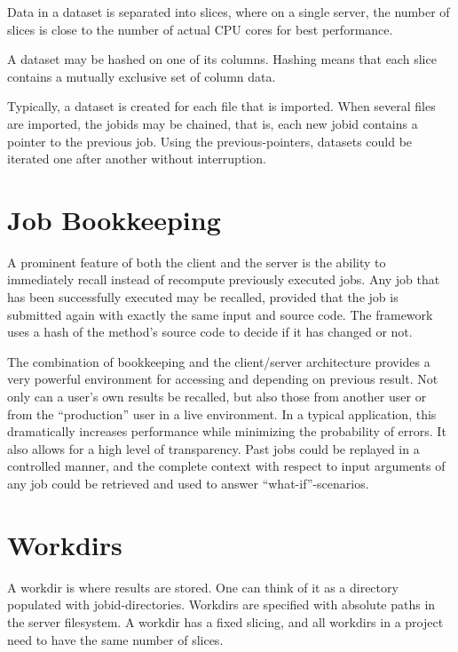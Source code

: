 Data in a dataset is separated into slices, where on a single server,
the number of slices is close to the number of actual CPU cores for
best performance.

A dataset may be hashed on one of its columns.  Hashing means that
each slice contains a mutually exclusive set of column data.

Typically, a dataset is created for each file that is imported.  When
several files are imported, the jobids may be chained, that is, each
new jobid contains a pointer to the previous job.  Using the
previous-pointers, datasets could be iterated one after another
without interruption.



\section{Job Bookkeeping}

A prominent feature of both the client and the server is the ability
to immediately recall instead of recompute previously executed jobs.
Any job that has been successfully executed may be recalled, provided
that the job is submitted again with exactly the same input and source
code.  The framework uses a hash of the method's source code to decide
if it has changed or not.

The combination of bookkeeping and the client/server architecture
provides a very powerful environment for accessing and depending on
previous result.  Not only can a user's own results be recalled, but
also those from another user or from the ``production'' user in a live
environment.  In a typical application, this dramatically increases
performance while minimizing the probability of errors.  It also
allows for a high level of transparency.  Past jobs could be replayed
in a controlled manner, and the complete context with respect to input
arguments of any job could be retrieved and used to answer
``what-if''-scenarios.




\section{Workdirs}

A workdir is where results are stored.  One can think of it as a
directory populated with jobid-directories.  Workdirs are specified
with absolute paths in the server filesystem.  A workdir has a fixed
slicing, and all workdirs in a project need to have the same number of
slices.


